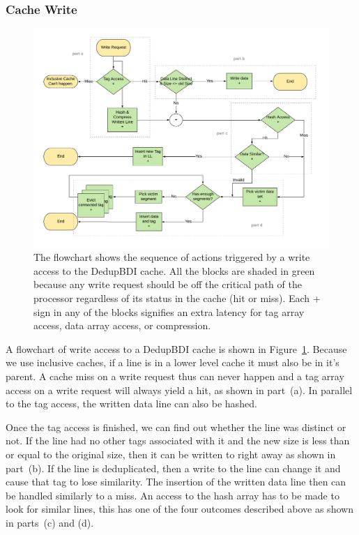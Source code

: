 \subsubsection{Cache Write}
\begin{figure}
    \includegraphics[width=\textwidth]{DedupBDI_Write.pdf}
    \caption[DedupBDI Write]{The flowchart shows the sequence of actions triggered by a write access to the DedupBDI cache. All the blocks are shaded in green because any write request should be off the critical path of the processor regardless of its status in the cache (hit or miss). Each + sign in any of the blocks signifies an extra latency for tag array access, data array access, or compression.}
    \label{fig:DedupBDI_Write}
\end{figure}
A flowchart of write access to a DedupBDI cache is shown in Figure~\ref{fig:DedupBDI_Write}. Because we use inclusive caches, if a line is in a lower level cache it must also be in it's parent. A cache miss on a write request thus can never happen and a tag array access on a write request will always yield a hit, as shown in part~(a). In parallel to the tag access, the written data line can also be hashed.\par
Once the tag access is finished, we can find out whether the line was distinct or not. If the line had no other tags associated with it and the new size is less than or equal to the original size, then it can be written to right away as shown in part~(b). If the line is deduplicated, then a write to the line can change it and cause that tag to lose similarity. The insertion of the written data line then can be handled similarly to a miss. An access to the hash array has to be made to look for similar lines, this has one of the four outcomes described above as shown in parts~(c) and (d).

